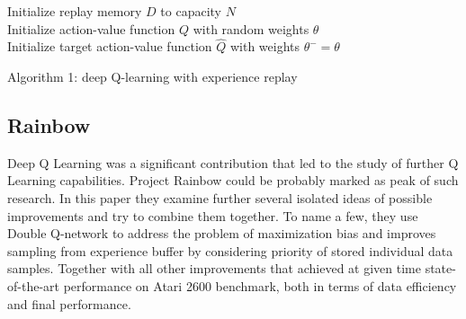 \begin{algorithm}
  Initialize replay memory $D$ to capacity $N$ \\
  Initialize action-value function $Q$ with random weights $\theta$ \\
  Initialize target action-value function $\hat{Q}$ with weights $\theta^- = \theta $\\
  
  \caption{Algorithm 1: deep Q-learning with experience replay}
  \label{DeepQLearning}
\end{algorithm}

\subsection*{Rainbow}
Deep Q Learning was a significant contribution that led to the study of further Q Learning capabilities.
Project Rainbow \cite{Rainbow} could be probably marked as peak of such research.
In this paper they examine further several isolated ideas of possible improvements and try to combine them together.
To name a few, they use Double Q-network to address the problem of maximization bias and improves sampling from experience buffer by considering priority of stored individual data samples.
Together with all other improvements that achieved at given time state-of-the-art performance on Atari 2600 benchmark, both in terms of data efficiency and final performance.








